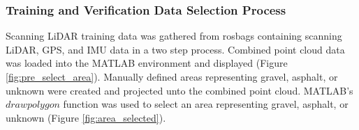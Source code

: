 \documentclass[numbered,pdftex]{ohio-etd}
\begin{document}
{{{{			} %
	
			\subsubsection{Training and Verification Data Selection Process}\label{sec:training_and_verification_data_selection_process}{

				{Scanning LiDAR training data was gathered from rosbags containing scanning LiDAR, GPS, and IMU data in a two step process. Combined point cloud data was loaded into the MATLAB environment and displayed (Figure \ref{fig:pre_select_area}). Manually defined areas representing gravel, asphalt, or unknown were created and projected unto the combined point cloud. MATLAB's $drawpolygon$ function was used to select an area representing gravel, asphalt, or unknown (Figure \ref{fig:area_selected}).}
	
}}}}
\end{document}
